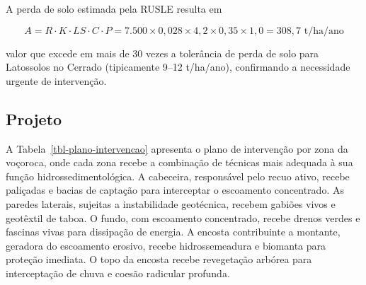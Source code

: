 \documentclass[
  portuguese,
  11pt,
  a4paper,
  open=any]{scrbook}
\begin{document}
A perda de solo estimada pela RUSLE resulta em

\[
A = R \cdot K \cdot LS \cdot C \cdot P = 7.500 \times 0{,}028 \times 4{,}2 \times 0{,}35 \times 1{,}0 = 308{,}7 \text{ t/ha/ano}
\]

valor que excede em mais de 30 vezes a tolerância de perda de solo para
Latossolos no Cerrado (tipicamente 9--12 t/ha/ano), confirmando a
necessidade urgente de intervenção.

\subsection{Projeto}\label{projeto}

A Tabela~\ref{tbl-plano-intervencao} apresenta o plano de intervenção
por zona da voçoroca, onde cada zona recebe a combinação de técnicas
mais adequada à sua função hidrossedimentológica. A cabeceira,
responsável pelo recuo ativo, recebe paliçadas e bacias de captação para
interceptar o escoamento concentrado. As paredes laterais, sujeitas a
instabilidade geotécnica, recebem gabiões vivos e geotêxtil de taboa. O
fundo, com escoamento concentrado, recebe drenos verdes e fascinas vivas
para dissipação de energia. A encosta contribuinte a montante, geradora
do escoamento erosivo, recebe hidrossemeadura e biomanta para proteção
imediata. O topo da encosta recebe revegetação arbórea para
interceptação de chuva e coesão radicular profunda.
\end{document}

